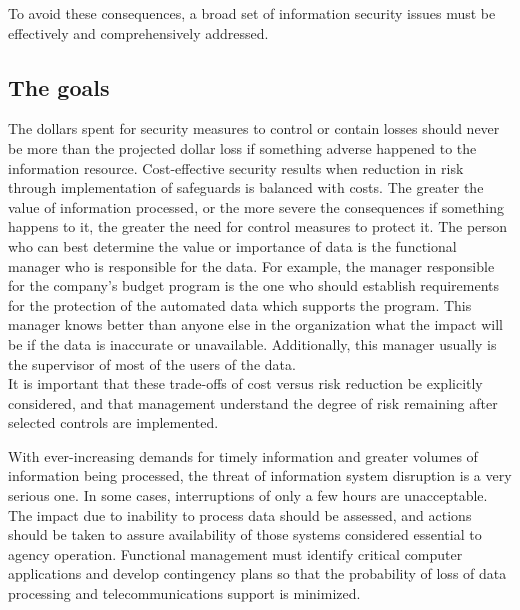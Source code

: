 To avoid these consequences, a broad set of information security issues
must be effectively and comprehensively addressed.

\subsection{The goals}

\begin{htmllist}

    
    The dollars spent for security measures to control or contain losses
    should never be more than the projected dollar loss if something
    adverse happened to the information resource. Cost-effective security
    results when reduction in risk through implementation of safeguards is
    balanced with costs. The greater the value of information processed, or
    the more severe the consequences if something happens to it, the
    greater the need for control measures to protect it. The person who can
    best determine the value or importance of data is the functional
    manager who is responsible for the data. For example, the manager
    responsible for the company's budget program is the one who should
    establish requirements for the protection of the automated data which
    supports the program. This manager knows better than anyone else in the
    organization what the impact will be if the data is inaccurate or
    unavailable. Additionally, this manager usually is the supervisor of
    most of the users of the data.\\
    
    It is important that these trade-offs of cost versus risk reduction be
    explicitly considered, and that management understand the degree of
    risk remaining after selected controls are implemented.

    
    With ever-increasing demands for timely information and greater volumes
    of information being processed, the threat of information system
    disruption is a very serious one. In some cases, interruptions of only
    a few hours are unacceptable. The impact due to inability to process
    data should be assessed, and actions should be taken to assure
    availability of those systems considered essential to agency operation.
    Functional management must identify critical computer applications and
    develop contingency plans so that the probability of loss of data
    processing and telecommunications support is minimized.


\end{htmllist}
